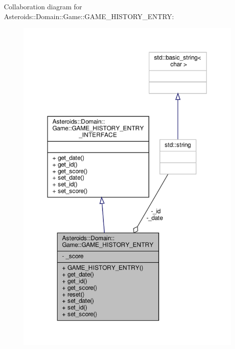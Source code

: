 Collaboration diagram for Asteroids\+:\+:Domain\+:\+:Game\+:\+:G\+A\+M\+E\+\_\+\+H\+I\+S\+T\+O\+R\+Y\+\_\+\+E\+N\+T\+RY\+:\nopagebreak
\begin{figure}[H]
\begin{center}
\leavevmode
\includegraphics[width=344pt]{classAsteroids_1_1Domain_1_1Game_1_1GAME__HISTORY__ENTRY__coll__graph}
\end{center}
\end{figure}
